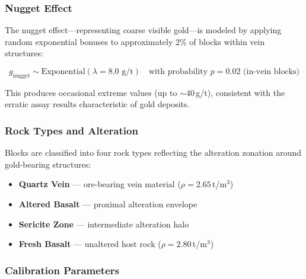 \documentclass[12pt,a4paper]{article}
\begin{document}
\subsubsection{Nugget Effect}

The nugget effect---representing coarse visible gold---is modeled by applying random exponential bonuses to approximately 2\% of blocks within vein structures:

\begin{equation}
    g_{\text{nugget}} \sim \text{Exponential}(\lambda = 8.0 \text{ g/t}) \quad \text{with probability } p = 0.02 \text{ (in-vein blocks)}
\end{equation}

This produces occasional extreme values (up to $\sim$40\,g/t), consistent with the erratic assay results characteristic of gold deposits.

\subsubsection{Rock Types and Alteration}

Blocks are classified into four rock types reflecting the alteration zonation around gold-bearing structures:

\begin{itemize}[itemsep=0.1em]
    \item \textbf{Quartz Vein} --- ore-bearing vein material ($\rho = 2.65$\,t/m$^3$)
    \item \textbf{Altered Basalt} --- proximal alteration envelope
    \item \textbf{Sericite Zone} --- intermediate alteration halo
    \item \textbf{Fresh Basalt} --- unaltered host rock ($\rho = 2.80$\,t/m$^3$)
\end{itemize}

\subsubsection{Calibration Parameters}
\end{document}
